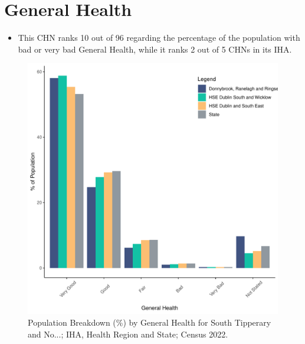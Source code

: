 \documentclass{article}
\begin{document}
\pagebreak

\section{General Health}\label{sect:GenHealth}
\begin{itemize}
\item  This CHN ranks  10 out of 96 regarding the percentage of the population with bad or very bad General Health, while it ranks   2 out of 5 CHNs in its IHA.
\end{itemize}
\begin{figure}[h]
	\centering
	\includegraphics[width = 150mm]{../figures/GenED.pdf}
	\caption{Population Breakdown (\%) by General Health for South Tipperary and No...; IHA, Health Region and State;  Census 2022.}
	\label{fig:2ae19629-1a6a-13a3-e055-000000000001}
	\end{figure}
\end{document}
